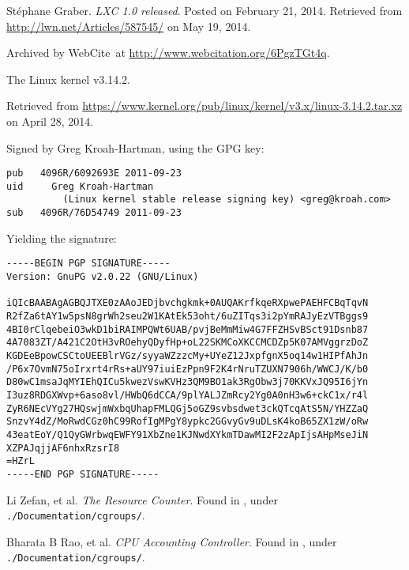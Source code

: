 \begin{thebibliography}{9}
Stéphane Graber. \emph{LXC 1.0 released}. Posted on February 21, 2014.
Retrieved from \url{http://lwn.net/Articles/587545/} on May 19, 2014.

Archived by WebCite\textsuperscript{\textregistered}\ at
\url{http://www.webcitation.org/6PgzTGt4q}.


The Linux kernel v3.14.2.

Retrieved from
\url{https://www.kernel.org/pub/linux/kernel/v3.x/linux-3.14.2.tar.xz} on April
28, 2014.

Signed by Greg Kroah-Hartman, using the GPG key:

\begin{lstlisting}
pub   4096R/6092693E 2011-09-23
uid     Greg Kroah-Hartman
          (Linux kernel stable release signing key) <greg@kroah.com>
sub   4096R/76D54749 2011-09-23
\end{lstlisting}

Yielding the signature:

\begin{lstlisting}
-----BEGIN PGP SIGNATURE-----
Version: GnuPG v2.0.22 (GNU/Linux)

iQIcBAABAgAGBQJTXE0zAAoJEDjbvchgkmk+0AUQAKrfkqeRXpwePAEHFCBqTqvN
R2fZa6tAY1w5psN8grWh2seu2W1KAtEk53oht/6uZITqs3i2pYmRAJyEzVTBggs9
4BI0rClqebeiO3wkD1biRAIMPQWt6UAB/pvjBeMmMiw4G7FFZHSvBSct91Dsnb87
4A7083ZT/A421C2OtH3vROehyQDyfHp+oL22SKMCoXKCCMCDZp5K07AMVggrzDoZ
KGDEeBpowCSCtoUEEBlrVGz/syyaWZzzcMy+UYeZ12JxpfgnX5oq14w1HIPfAhJn
/P6x7OvmN75oIrxrt4rRs+aUY97iuiEzPpn9F2K4rNruTZUXN7906h/WWCJ/K/b0
D80wC1msaJqMYIEhQICu5kwezVswKVHz3QM9BO1ak3RgObw3j70KKVxJQ95I6jYn
I3uz8RDGXWvp+6aso8vl/HWbQ6dCCA/9plYALJZmRcy2Yg0A0nH3w6+ckC1x/r4l
ZyR6NEcVYg27HQswjmWxbqUhapFMLQGj5oGZ9svbsdwet3ckQTcqAtS5N/YHZZaQ
SnzvY4dZ/MoRwdCGz0hC99RofIgMPgY8ypkc2GGvyGv9uDLsK4koB65ZX1zW/oRw
43eatEoY/Q1QyGWrbwqEWFY91XbZne1KJNwdXYkmTDawMI2F2zApIjsAHpMseJiN
XZPAJqjjAF6nhxRzsrI8
=HZrL
-----END PGP SIGNATURE-----
\end{lstlisting}


Li Zefan, et al.  \emph{The Resource Counter}. Found in
\cite{linux-kernel-v3.14.2}, under \texttt{./Documentation/cgroups/}.


Bharata B Rao, et al. \emph{CPU Accounting Controller}.  Found in
\cite{linux-kernel-v3.14.2}, under \texttt{./Documentation/cgroups/}.


\end{thebibliography}
